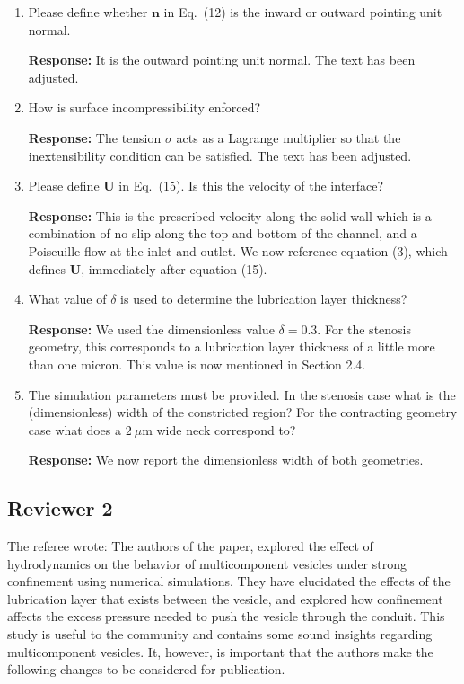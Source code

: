 \documentclass[11pt]{article}
\begin{document}
\begin{enumerate}
\item Please define whether $\mathbf{n}$ in Eq.~(12) is the inward or outward pointing unit normal.

\noindent
{\bf Response:} It is the outward pointing unit normal. The text has
    been adjusted.

\item How is surface incompressibility enforced?

\noindent
{\bf Response:} The tension $\sigma$ acts as a Lagrange multiplier so
    that the inextensibility condition can be satisfied. The text has
    been adjusted.

\item Please define $\mathbf{U}$ in Eq.~(15). Is this the velocity of
  the interface?

{\bf Response:} This is the prescribed velocity along the solid wall
    which is a combination of no-slip along the top and bottom of the
    channel, and a Poiseuille flow at the inlet and outlet. We now
    reference equation (3), which defines $\mathbf{U}$, immediately
    after equation (15). 

\item What value of $\delta$ is used to determine the lubrication layer
  thickness?

{\bf Response:} We used the dimensionless value $\delta = 0.3$. For the
stenosis geometry, this corresponds to a lubrication layer thickness of
a little more than one micron. This value is now mentioned in Section
2.4.

\item The simulation parameters must be provided. In the stenosis case
  what is the (dimensionless) width of the constricted region? For the
    contracting geometry case what does a $2~\mu$m wide neck correspond
    to?

{\bf Response:} We now report the dimensionless width of both
geometries.

\end{enumerate}

\newpage 
\subsection*{Reviewer 2}

The referee wrote: The authors of the paper, explored the effect of
hydrodynamics on the behavior of multicomponent vesicles under strong
confinement using numerical simulations. They have elucidated the
effects of the lubrication layer that exists between the vesicle, and
explored how confinement affects the excess pressure needed to push the
vesicle through the conduit. This study is useful to the community and
contains some sound insights regarding multicomponent vesicles. It,
however, is important that the authors make the following changes to be
considered for publication.
\end{document}
